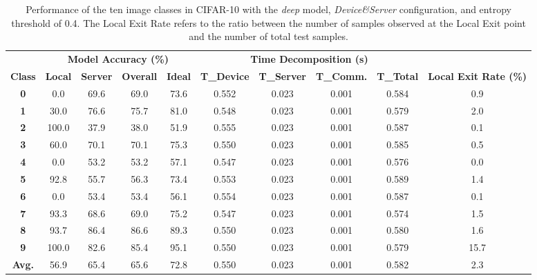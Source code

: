 \documentclass[format=acmsmall, review=false, screen=true]{acmart}
\begin{document}
    \begin{table}[hbt]
        \centering
        \caption{Performance of the ten image classes in CIFAR-10 with the \emph{deep} model, \emph{Device\&Server} configuration, and entropy threshold of 0.4. The Local Exit Rate refers to the ratio between the number of samples observed at the Local Exit point and the number of total test samples.}
        \label{tab:3}
        \scriptsize{
        \begin{tabular}{c|cccc|cccc|c}
              & \multicolumn{4}{c|}{\textbf{Model Accuracy (\%)}} & \multicolumn{4}{c|}{\textbf{Time Decomposition (s)}} &                   \\
        \textbf{Class} & \textbf{Local}     & \textbf{Server}  & \textbf{Overall}  & \textbf{Ideal}   & \textbf{T\_Device} & \textbf{T\_Server} & \textbf{T\_Comm.} & \textbf{T\_Total} & \textbf{Local Exit Rate (\%)} \\ \hline\hline
        \textbf{0}     & 0.0     & 69.6  & 69.0   & 73.6  & 0.552    & 0.023    & 0.001   & 0.584   & 0.9             \\
        \textbf{1}     & 30.0    & 76.6  & 75.7   & 81.0  & 0.548    & 0.023    & 0.001   & 0.579   & 2.0             \\
        \textbf{2}     & 100.0   & 37.9  & 38.0   & 51.9  & 0.555    & 0.023    & 0.001   & 0.587   & 0.1             \\
        \textbf{3}     & 60.0    & 70.1  & 70.1   & 75.3  & 0.550    & 0.023    & 0.001   & 0.585   & 0.5             \\
        \textbf{4}     & 0.0     & 53.2  & 53.2   & 57.1  & 0.547    & 0.023    & 0.001   & 0.576   & 0.0             \\
        \textbf{5}     & 92.8    & 55.7  & 56.3   & 73.4  & 0.553    & 0.023    & 0.001   & 0.589   & 1.4             \\
        \textbf{6}     & 0.0     & 53.4  & 53.4   & 56.1  & 0.554    & 0.023    & 0.001   & 0.587   & 0.1             \\
        \textbf{7}     & 93.3    & 68.6  & 69.0   & 75.2  & 0.547    & 0.023    & 0.001   & 0.574   & 1.5             \\
        \textbf{8}     & 93.7    & 86.4  & 86.6   & 89.3  & 0.550    & 0.023    & 0.001   & 0.580   & 1.6             \\
        \textbf{9}     & 100.0   & 82.6  & 85.4   & 95.1  & 0.550    & 0.023    & 0.001   & 0.579   & 15.7            \\ \hline
        \textbf{Avg.}  & 56.9    & 65.4  & 65.6   & 72.8  & 0.550    & 0.023    & 0.001   & 0.582   & 2.3             \\ \hline
        \end{tabular}
        }%
    \end{table}
\end{document}
